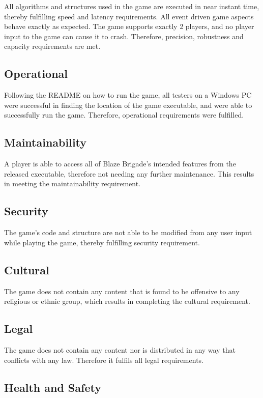 \documentclass{article}
\begin{document}
All algorithms and structures used in the game are executed in near instant time, thereby fulfilling speed and latency requirements. All event driven game aspects behave exactly as expected. The game supports exactly 2 players, and no player input to the game can cause it to crash. Therefore, precision, robustness and capacity requirements are met.

\subsection{Operational}

Following the README on how to run the game, all testers on a Windows PC were successful in finding the location of the game executable, and were able to successfully run the game. Therefore, operational requirements were fulfilled.

\subsection{Maintainability}

A player is able to access all of Blaze Brigade's intended features from the released executable, therefore not needing any further maintenance. This results in meeting the maintainability requirement.

\subsection{Security}

The game's code and structure are not able to be modified from any user input while playing the game, thereby fulfilling security requirement.

\subsection{Cultural}

The game does not contain any content that is found to be offensive to any religious or ethnic group, which results in completing the cultural requirement. 

\subsection{Legal}

The game does not contain any content nor is distributed in any way that conflicts with any law. Therefore it fulfils all legal requirements.

\subsection{Health and Safety}
\end{document}
